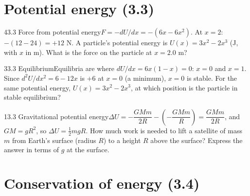 \documentclass[11pt]{article}
\begin{document}
\section{Potential energy (3.3)}

\begin{q}{4}{3.3 Force from potential energy}{$F = -dU/dx = -(6x - 6x^2)$. At $x = 2$: $-(12 - 24) = +12$ N.}
A particle's potential energy is $U(x) = 3x^2 - 2x^3$ (J, with $x$ in m). What is the force on the particle at $x = 2.0$ m?
\end{q}
\begin{q}{3}{3.3 Equilibrium}{Equilibria are where $dU/dx = 6x(1 - x) = 0$: $x = 0$ and $x = 1$. Since $d^2U/dx^2 = 6 - 12x$ is $+6$ at $x = 0$ (a minimum), $x = 0$ is stable.}
For the same potential energy, $U(x) = 3x^2 - 2x^3$, at which position is the particle in stable equilibrium?
\end{q}
\begin{q}{1}{3.3 Gravitational potential energy}{$\Delta U = -\dfrac{GMm}{2R} - \left(-\dfrac{GMm}{R}\right) = \dfrac{GMm}{2R}$, and $GM = gR^2$, so $\Delta U = \tfrac12 mgR$.}
How much work is needed to lift a satellite of mass $m$ from Earth's surface (radius $R$) to a height $R$ above the surface? Express the answer in terms of $g$ at the surface.
\end{q}

\section{Conservation of energy (3.4)}
\end{document}
